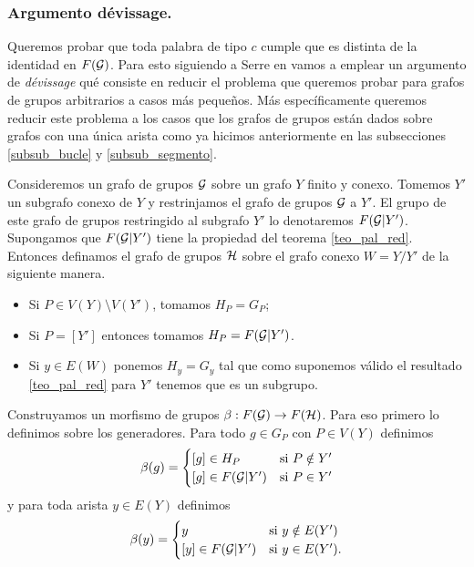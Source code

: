 \documentclass[tesis.tex]{subfiles}
\begin{document}
\subsubsection{Argumento dévissage.}


Queremos probar que toda palabra de tipo $c$ cumple que es distinta de la identidad en $F({\cal G})$. 
Para esto siguiendo a Serre en \cite{serre2002trees} vamos a emplear un argumento de \emph{dévissage} qué consiste en reducir el problema que queremos probar para grafos de grupos arbitrarios a casos más pequeños. 
Más específicamente queremos reducir este problema a los casos que los grafos de grupos están dados sobre grafos con una única arista como ya hicimos anteriormente en las subsecciones \ref{subsub_bucle} y \ref{subsub_segmento}.

Consideremos un grafo de grupos ${\cal G}$ sobre un grafo $Y$ finito y conexo. 
Tomemos $Y'$ un subgrafo conexo de $Y$ y restrinjamos el grafo de grupos ${\cal G}$ a $Y'$. 
El grupo de este grafo de grupos restringido al subgrafo $Y'$ lo denotaremos $F({\cal G} | Y')$.
Supongamos que $F({\cal G} | Y')$ tiene la propiedad del teorema \ref{teo_pal_red}.
Entonces definamos el grafo de grupos $\cal H$ sobre el grafo conexo $W=Y/Y'$ de la siguiente manera.
\begin{itemize}
	\item Si $P \in V(Y) \setminus V(Y')$, tomamos $H_P = G_P$;
	\item Si $P = [Y']$ entonces tomamos $H_P = F({\cal G} | Y')$.
	\item Si $y \in E(W)$ ponemos $H_y = G_y$ tal que como suponemos válido el resultado \ref{teo_pal_red} para $Y'$ tenemos que es un subgrupo.
\end{itemize}

Construyamos un morfismo de grupos $\beta:F({\cal G}) \to F({\cal H})$.
Para eso primero lo definimos sobre los generadores.
Para todo $g \in G_P$ con $P \in V(Y)$ definimos
\begin{equation*}
	\beta(g) = 
	\begin{cases}
		[g] \in H_P & \text{si} \ P \notin Y' \\
		[g] \in F({\cal G} | Y') & \text{si} \ P \in Y'  \\ 
	\end{cases}
\end{equation*}
y para toda arista $ y \in E(Y)$ definimos
\begin{equation*}
	\beta(y) = 
	\begin{cases}
		y  & \text{si} \ y \notin E(Y') \\
		[y] \in F({\cal G} | Y') & \text{si} \ y \in E(Y').  \\ 
	\end{cases}
\end{equation*}
\end{document}
